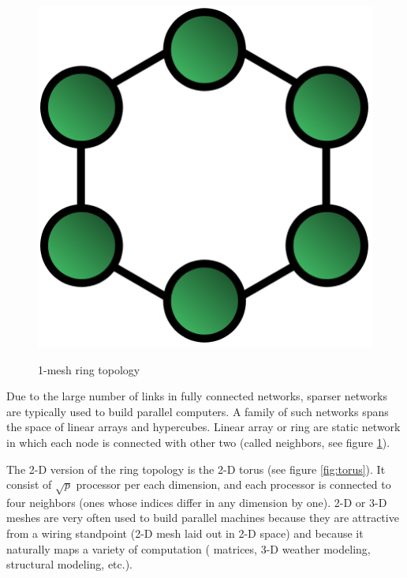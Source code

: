 \begin{figure}
\centering
\includegraphics[scale=0.3]{./images/ring}
\caption{1-mesh ring topology}
\setlength{\fboxrule}{1pt}%
\label{fig:ring}
\end{figure}
Due to the large number of links in fully connected networks, sparser networks
are typically used to build parallel computers. A family of such networks spans the space of linear arrays and
hypercubes.
Linear array or ring are static network in which each node is connected with
other two (called neighbors, see figure \ref{fig:ring}).

The 2-D version of the ring topology is the 2-D torus (see figure
\ref{fig:torus}).
It consist of \(\sqrt{p}\) processor per each dimension, and each processor is connected to
four neighbors (ones whose indices differ in any dimension by one). 2-D or 3-D
meshes are very often used to build parallel machines because they are attractive from a
wiring standpoint (2-D mesh laid out in 2-D space) and because it naturally
maps a variety of computation ( matrices, 3-D weather modeling, structural
modeling, etc.). 



